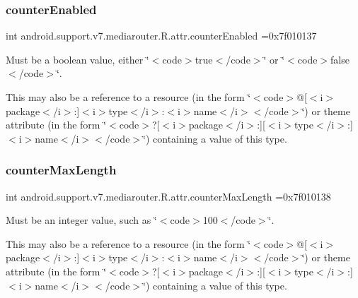 \subsubsection{\texorpdfstring{counter\+Enabled}{counterEnabled}}
{\footnotesize\ttfamily int android.\+support.\+v7.\+mediarouter.\+R.\+attr.\+counter\+Enabled =0x7f010137\hspace{0.3cm}{\ttfamily [static]}}

Must be a boolean value, either \char`\"{}$<$code$>$true$<$/code$>$\char`\"{} or \char`\"{}$<$code$>$false$<$/code$>$\char`\"{}. 

This may also be a reference to a resource (in the form \char`\"{}$<$code$>$@\mbox{[}$<$i$>$package$<$/i$>$\+:\mbox{]}$<$i$>$type$<$/i$>$\+:$<$i$>$name$<$/i$>$$<$/code$>$\char`\"{}) or theme attribute (in the form \char`\"{}$<$code$>$?\mbox{[}$<$i$>$package$<$/i$>$\+:\mbox{]}\mbox{[}$<$i$>$type$<$/i$>$\+:\mbox{]}$<$i$>$name$<$/i$>$$<$/code$>$\char`\"{}) containing a value of this type. \mbox{\label{classandroid_1_1support_1_1v7_1_1mediarouter_1_1R_1_1attr_aef123b7d5dda75ae66b80093cc4058b8}} 
\subsubsection{\texorpdfstring{counter\+Max\+Length}{counterMaxLength}}
{\footnotesize\ttfamily int android.\+support.\+v7.\+mediarouter.\+R.\+attr.\+counter\+Max\+Length =0x7f010138\hspace{0.3cm}{\ttfamily [static]}}

Must be an integer value, such as \char`\"{}$<$code$>$100$<$/code$>$\char`\"{}. 

This may also be a reference to a resource (in the form \char`\"{}$<$code$>$@\mbox{[}$<$i$>$package$<$/i$>$\+:\mbox{]}$<$i$>$type$<$/i$>$\+:$<$i$>$name$<$/i$>$$<$/code$>$\char`\"{}) or theme attribute (in the form \char`\"{}$<$code$>$?\mbox{[}$<$i$>$package$<$/i$>$\+:\mbox{]}\mbox{[}$<$i$>$type$<$/i$>$\+:\mbox{]}$<$i$>$name$<$/i$>$$<$/code$>$\char`\"{}) containing a value of this type. \mbox{\label{classandroid_1_1support_1_1v7_1_1mediarouter_1_1R_1_1attr_aa04cf2f0df85f42d9d16c4f0c35e3f3d}} 
